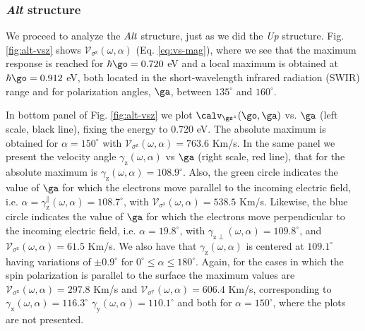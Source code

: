 \documentclass[prb,11pt,tightenlines,twocolumn,aps]{revtex4-1}
\begin{document}

\subsubsection{\emph{Alt} structure}

We proceed to analyze the $\emph{Alt}$ structure, just as we did the \emph{Up}
structure. Fig. \ref{fig:alt-vsz} shows $\mathcal{V}_{\sigma^{\mathrm{z}}}
(\omega,\alpha)$ (Eq. \eqref{eq:vs-mag}), where we see that the maximum
response is reached for $\hbar\go=0.720$ eV and a local maximum is obtained at
$\hbar\go=0.912$ eV, both located in the short-wavelength infrared radiation
(SWIR) range and for polarization angles, $\ga$,  between $135^{\circ}$ and
$160^{\circ}$.

In bottom panel of Fig. \ref{fig:alt-vsz} we plot $\calv_{\gs^z}(\go,\ga)$ vs.
$\ga$ (left scale, black line), fixing the energy to 0.720 eV. The absolute
maximum is obtained for $\alpha = 150^{\circ}$ with
$\mathcal{V}_{\sigma^{\mathrm{z}}} (\omega,\alpha) = 763.6$ Km/s.
% 
In the same panel we present the velocity angle
$\gamma_{\mathrm{z}}(\omega,\alpha)$ vs $\ga$ (right scale, red line), that for
the absolute maximum is $\gamma_{\mathrm{z}}(\omega,\alpha) = 108.9^{\circ}$.
% 
Also, the green circle indicates the value of $\ga$ for which the electrons
move parallel to the incoming electric field, i.e. $\alpha =
\gamma_{\mathrm{z}}^\parallel(\omega,\alpha) = 108.7^{\circ}$, with
$\mathcal{V}_{\sigma^{\mathrm{z}}}(\omega,\alpha) = 538.5$ Km/s. Likewise, the
blue circle indicates the value of $\ga$ for which the electrons move
perpendicular to the incoming electric field, i.e. $\alpha=19.8^{\circ}$, with
$\gamma_{\mathrm{z}\perp}(\omega,\alpha)=109.8^{\circ}$, and
$\mathcal{V}_{\sigma^{\mathrm{z}}} (\omega,\alpha)=61.5$ Km/s.
% 
We also have that $\gamma_{\mathrm{z}}(\omega,\alpha)$ is centered at
$109.1^{\circ}$ having variations of $\pm 0.9^{\circ}$ for $0^{\circ} \leq
\alpha \leq 180^{\circ}$.
% 
Again, for the cases in which the spin polarization is parallel to the surface
the maximum values are $\mathcal{V}_{\sigma^{\mathrm{x}}}(\omega,\alpha) =
297.8$ Km/s and $\mathcal{V}_{\sigma^{\mathrm{y}}}(\omega,\alpha) = 606.4$
Km/s, corresponding to $\gamma_{\mathrm{x}}(\omega,\alpha) = 116.3^{\circ}$
$\gamma_{\mathrm{y}}(\omega,\alpha) = 110.1^{\circ}$ and both for
$\alpha=150^{\circ}$, where the plots are not presented.
\end{document}
